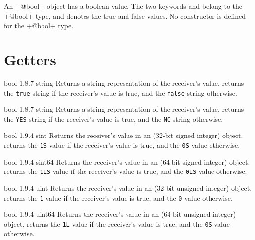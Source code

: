 

An \ggs+@bool+ object has a boolean value. The two keywords  and  belong to the \ggs+@bool+ type, and denotes the true and false values. No constructor is defined for the \ggs+@bool+ type.

\section{Getters}

{bool}
{1.8.7}
{string}
{Returns a string representation of the receiver's value.}
{returns the \texttt{\textquotedbl true\textquotedbl} string if the receiver's value is true, and the \texttt{\textquotedbl false\textquotedbl} string otherwise.}







{bool}
{1.8.7}
{string}
{Returns a string representation of the receiver's value.}
{returns the \texttt{\textquotedbl YES\textquotedbl} string if the receiver's value is true, and the \texttt{\textquotedbl NO\textquotedbl} string otherwise.}




{bool}
{1.9.4}
{sint}
{Returns the receiver's value in an  (32-bit signed integer) object.}
{returns the \texttt{1S}  value if the receiver's value is true, and the \texttt{0S}  value otherwise.}




{bool}
{1.9.4}
{sint64}
{Returns the receiver's value in an  (64-bit signed integer) object.}
{returns the \texttt{1LS}  value if the receiver's value is true, and the \texttt{0LS}  value otherwise.}




{bool}
{1.9.4}
{uint}
{Returns the receiver's value in an  (32-bit unsigned integer) object.}
{returns the \texttt{1}  value if the receiver's value is true, and the \texttt{0}  value otherwise.}




{bool}
{1.9.4}
{uint64}
{Returns the receiver's value in an  (64-bit unsigned integer) object.}
{returns the \texttt{1L}  value if the receiver's value is true, and the \texttt{0S}  value otherwise.}




